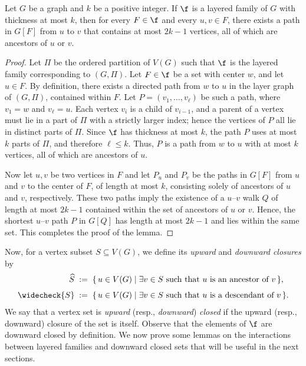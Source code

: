 \begin{lemma}\label{lem:ancestral_path}
    Let $G$ be a graph and $k$ be a positive integer. If $\f$ is a layered family of $G$ with thickness at most $k$, then for every $F \in \f$ and every $u,v \in F$, there exists a path in $G[F]$ from $u$ to $v$ that contains at most $2k-1$ vertices, all of which are ancestors of $u$ or $v$.
\end{lemma}
\begin{proof}
    Let $\Pi$ be the ordered partition of $V(G)$ such that $\f$ is the layered family corresponding to $(G,\Pi)$. Let $F \in \f$ be a set with center $w$, and let $u \in F$. By definition, there exists a directed path from $w$ to $u$ in the layer graph of $(G,\Pi)$, contained within $F$. Let $P = (v_1,\dots,v_\ell)$ be such a path, where $v_1 = w$ and $v_\ell = u$. Each vertex $v_i$ is a child of $v_{i-1}$, and a parent of a vertex must lie in a part of $\Pi$ with a strictly larger index; hence the vertices of $P$ all lie in distinct parts of $\Pi$. Since $\f$ has thickness at most $k$, the path $P$ uses at most $k$ parts of $\Pi$, and therefore $\ell \leq k$. Thus, $P$ is a path from $w$ to $u$ with at most $k$ vertices, all of which are ancestors of $u$.
    
    Now let $u,v$ be two vertices in $F$ and let $P_u$ and $P_v$ be the paths in $G[F]$ from $u$ and $v$ to the center of $F$, of length at most $k$, consisting solely of ancestors of $u$ and $v$, respectively. These two paths imply the existence of a $u$--$v$ walk $Q$ of length at most $2k-1$ contained within the set of ancestors of $u$ or $v$. Hence, the shortest $u$--$v$ path $P$ in $G[Q]$ has length at most $2k-1$ and lies within the same set. This completes the proof of the lemma.
\end{proof}

Now, for a vertex subset $S \subseteq V(G)$, we define its \emph{upward} and \emph{downward closures} by
\begin{align*}
    \widehat{S} \; &:=\;
        \{\, u \in V(G) \mid \exists v \in S \text{ such that } u \text{ is an ancestor of } v \,\}, \\[4pt]
    \widecheck{S} \; &:=\;
        \{\, u \in V(G) \mid \exists v \in S \text{ such that } u \text{ is a descendant of } v \,\}.
\end{align*}
We say that a vertex set is \emph{upward} (resp., \emph{downward}) \emph{closed} if the upward (resp., downward) closure of the set is itself. Observe that the elements of $\f$ are downward closed by definition. We now prove some lemmas on the interactions between layered families and downward closed sets that will be useful in the next sections.

